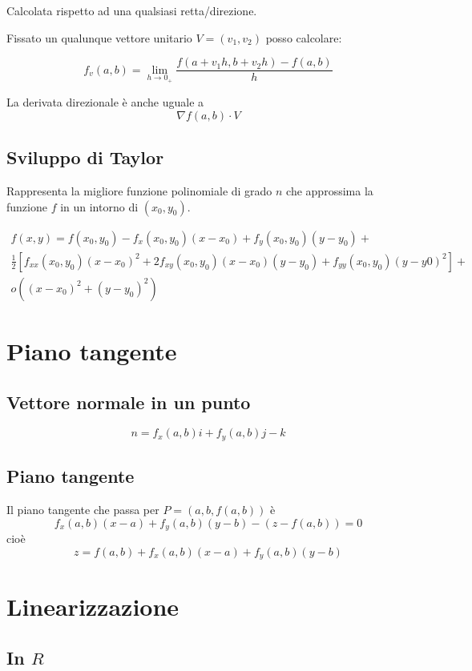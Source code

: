 Calcolata rispetto ad una qualsiasi retta/direzione.

Fissato un qualunque vettore unitario $V=(v_1,v_2)$ posso calcolare:

$$
f_v(a,b) = \lim_{h\to 0_+} \frac{f(a+v_1h,b+v_2h)-f(a,b)}{h}
$$

La derivata direzionale è anche uguale a $$\nabla f(a,b)\cdot V$$

\subsection{Sviluppo di Taylor}

Rappresenta la migliore funzione polinomiale di grado $n$ che approssima la funzione $f$ in un intorno di $(x_0, y_0)$.

\begin{multline*}
f(x,y) = f(x_0,y_0)-f_x(x_0,y_0)(x-x_0)+f_y(x_0,y_0)(y-y_0)+ \\ \frac{1}{2} [f_{xx}(x_0,y_0)(x-x_0)^2+2f_{xy}(x_0,y_0)(x-x_0)(y-y_0)+f_{yy}(x_0,y_0)(y-y0)^2]+ \\ o((x-x_0)^2+(y-y_0)^2)
\end{multline*}

\section{Piano tangente}

\subsection{Vettore normale in un punto}

$$n = f_x(a,b)i+f_y(a,b)j-k$$

\subsection{Piano tangente}

Il piano tangente che passa per $P = (a,b,f(a,b))$ è $$f_x(a,b)(x-a)+f_y(a,b)(y-b)-(z-f(a,b))=0$$ cioè
$$z = f(a,b) + f_x(a,b)(x-a) + f_y(a,b)(y-b)$$

\section{Linearizzazione}

\subsection{In $R$}

